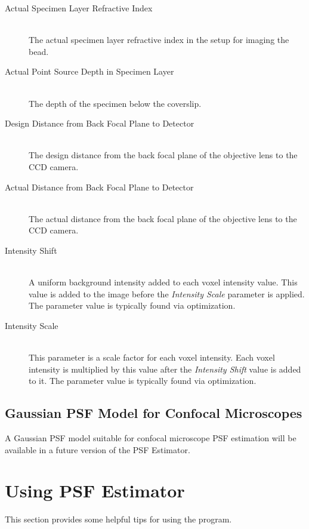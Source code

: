 \documentclass[11pt,titlepage,twoside]{article}
\begin{document}
\begin{description}
  \item[Actual Specimen Layer Refractive Index] \hfill \\
   The actual specimen layer refractive index in the setup for imaging the bead.
  
  \item[Actual Point Source Depth in Specimen Layer] \hfill \\
   The depth of the specimen below the coverslip.
  
  \item[Design Distance from Back Focal Plane to Detector] \hfill \\
   The design distance from the back focal plane of the objective lens to the CCD camera.
  
  \item[Actual Distance from Back Focal Plane to Detector] \hfill \\
   The actual distance from the back focal plane of the objective lens to the CCD camera.
  
  \item[Intensity Shift] \hfill \\
   A uniform background intensity added to each voxel intensity value. This value is added to the image before the \emph{Intensity Scale} parameter is applied. The parameter value is typically found via optimization.
  
  \item[Intensity Scale] \hfill \\
   This parameter is a scale factor for each voxel intensity. Each voxel intensity is multiplied by this value after the \emph{Intensity Shift} value is added to it. The parameter value is typically found via optimization.
 
\end{description}

\subsection{Gaussian PSF Model for Confocal Microscopes}

A Gaussian PSF model suitable for confocal microscope PSF estimation will be available in a future version of the PSF Estimator.

\section{Using PSF Estimator}

This section provides some helpful tips for using the program.
\end{document}
